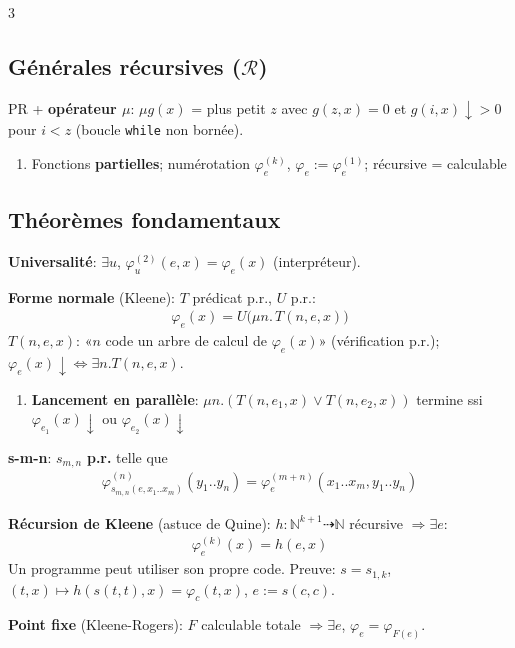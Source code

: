 \documentclass[12pt, a4paper]{article}
\newcommand{\cN}{\mathbb{N}}
\newcommand{\dv}{{\downarrow}}
\newcommand{\ff}{\varphi}
\newcommand{\tto}{\dashrightarrow}
\begin{document}
\begin{multicols*}{3}
	\subsection{Générales récursives ($\mathcal R$)}
	PR + \textbf{opérateur $\mu$}: $\mu g(x)$ = plus petit $z$ avec $g(z,x)=0$ et $g(i,x)\dv>0$ pour $i<z$ (boucle \texttt{while} non bornée).
	\begin{enumerate}[\roman*.]
		\item Fonctions \textbf{partielles}; numérotation $\ff_e^{(k)}$, $\ff_e:=\ff_e^{(1)}$; récursive = calculable
	\end{enumerate}

	\colbreak
	\subsection{Théorèmes fondamentaux}
	\textbf{Universalité}: $\exists u$, $\ff_u^{(2)}(e,x)=\ff_e(x)$ (interpréteur).

	\textbf{Forme normale} (Kleene): $T$ prédicat p.r., $U$ p.r.:
	\begin{gather*}
		\ff_e(x)=U\big(\mu n.\,T(n,e,x)\big)
	\end{gather*}
	$T(n,e,x)$: «$n$ code un arbre de calcul de $\ff_e(x)$» (vérification p.r.); $\ff_e(x)\dv\iff\exists n.T(n,e,x)$.
	\begin{enumerate}[\roman*.]
		\item \textbf{Lancement en parallèle}: $\mu n.(T(n,e_1,x)\vee T(n,e_2,x))$ termine ssi $\ff_{e_1}(x)\dv$ ou $\ff_{e_2}(x)\dv$
	\end{enumerate}

	\textbf{s-m-n}: $s_{m,n}$ \textbf{p.r.} telle que
	\begin{gather*}
		\ff^{(n)}_{s_{m,n}(e,x_1..x_m)}(y_1..y_n)=\ff_e^{(m+n)}(x_1..x_m,y_1..y_n)
	\end{gather*}

	\textbf{Récursion de Kleene} (astuce de Quine): $h:\cN^{k+1}\tto\cN$ récursive $\Rightarrow\exists e$:
	\begin{gather*}
		\ff_e^{(k)}(x)=h(e,x)
	\end{gather*}
	Un programme peut utiliser son propre code. Preuve: $s=s_{1,k}$, $(t,x)\mapsto h(s(t,t),x)=\ff_c(t,x)$, $e:=s(c,c)$.

	\textbf{Point fixe} (Kleene-Rogers): $F$ calculable totale $\Rightarrow\exists e$, $\ff_e=\ff_{F(e)}$.


\end{multicols*}
\end{document}

